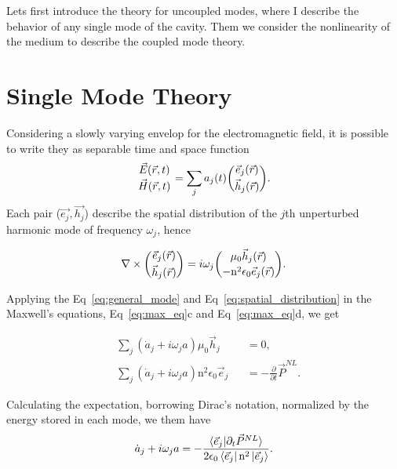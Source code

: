 Lets first introduce the theory for uncoupled modes, where I describe the behavior of any single mode of the cavity. Them we consider the nonlinearity of the medium to describe the coupled mode theory. 

\section{Single Mode Theory}

Considering a slowly varying envelop for the electromagnetic field, it is possible to write they as separable time and space function
\begin{equation}
    \genfrac{}{}{0 pt}{}{\vec{E}(\vec{r},t)}{\vec{H}(\vec{r},t)} = \sum_j a_j(t)\genfrac{(}{)}{0 pt}{}{\vec{e}_j(\vec{r})}{\vec{h}_j(\vec{r})}.
    \label{eq:general_mode}
\end{equation}
Each pair ($\vec{e_j},\vec{h_j}$) describe the spatial distribution of the $j$th unperturbed harmonic mode of frequency $\omega_j$, hence 

\begin{equation}
    \nabla \times \genfrac{(}{)}{0 pt}{}{\vec{e}_j(\vec{r})}{\vec{h}_j(\vec{r})} = i\omega_j \genfrac{(}{)}{0 pt}{}{\mu_0\vec{h}_j(\vec{r})}{-\n^2\epsilon_0\vec{e}_j(\vec{r})}.
    \label{eq:spatial_distribution}
\end{equation}

Applying the Eq~\ref{eq:general_mode} and Eq~\ref{eq:spatial_distribution} in the Maxwell's equations, Eq~\ref{eq:max_eq}c and Eq~\ref{eq:max_eq}d, we get

\begin{subequations}
    \begin{alignat}{2}
        &\sum_j \left(\dot{a}_j + i \omega_j a\right) \mu_0 \vec{h}_j &&= 0,\\
        &\sum_j \left(\dot{a}_j + i \omega_j a\right) \text{n}^2\epsilon_0 \vec{e}_j &&= -\frac{\partial}{\partial t}\vec{P}^{NL}.
    \end{alignat}
\end{subequations}

Calculating the expectation, borrowing Dirac's notation, normalized by the energy stored in each mode, we them have 
\begin{equation}
    \dot{a}_j + i \omega_j a = -\frac{\braket{\vec{e}_j|\partial_t\vec{P}^{NL}}}{2\epsilon_0\bra{\vec{e}_j}\text{n}^2\ket{\vec{e}_j}}.
    \label{eq:rate_equation_1}
\end{equation}

